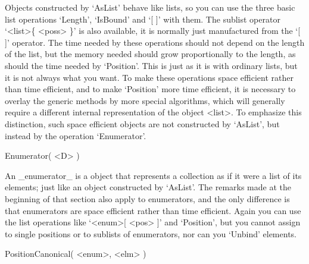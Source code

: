 Objects constructed by  `AsList' behave like lists, so   you can use  the
three basic list operations `Length', `IsBound' and `[  ]' with them. The
sublist operator `<list>\{ <poss>  \}' is also  available, it is normally
just  manufactured from the  `[  ]' operator.  The  time needed  by these
operations  should not depend on  the length of the  list, but the memory
needed should grow proportionally  to   the length,  as should  the  time
needed by `Position'. This  is just as it is  with ordinary lists, but it
is not always  what you want. To   make these operations  space efficient
rather  than time efficient, and to  make `Position' more time efficient,
it  is  necessary    to overlay the  generic   methods   by  more special
algorithms,  which    will  generally   require   a   different  internal
representation of the object  <list>. To emphasize this distinction, such
space  efficient objects are not  constructed by `AsList', but instead by
the operation `Enumerator'.

\>Enumerator( <D> )

An _enumerator_ is a {\GAP} object that represents  a collection as if it
were a list of its elements; just like an object constructed by `AsList'.
The  remarks  made  at  the  beginning  of  that  section   also apply to
enumerators,  and the only    difference is  that enumerators  are  space
efficient  rather than  time    efficient. Again  you can  use   the list
operations like `<enum>[ <pos> ]'  and `Position', but you cannot  assign
to single positions or  to sublists of enumerators,  nor can you `Unbind'
elements.

\>PositionCanonical( <enum>, <elm> )

